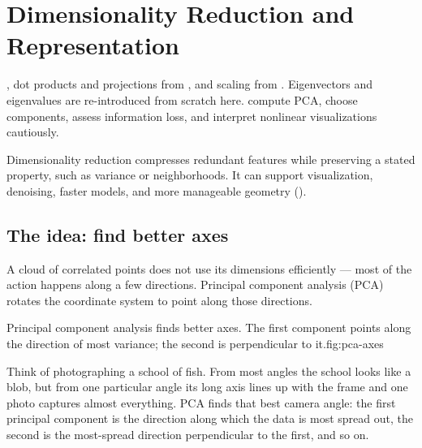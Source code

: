 \chapter{Dimensionality Reduction and Representation}
\label{ch:dimred}

\chapterguide%
  {, dot products and projections from , and scaling from . Eigenvectors and eigenvalues are re-introduced from scratch here.}
  {compute PCA, choose components, assess information loss, and interpret nonlinear visualizations cautiously.}

Dimensionality reduction compresses redundant features while preserving a stated property, such as variance or neighborhoods. It can support visualization, denoising, faster models, and more manageable geometry ().

\section{The idea: find better axes}

A cloud of correlated points does not use its dimensions efficiently --- most of the action happens along a few directions. Principal component analysis (PCA) rotates the coordinate system to point along those directions.

\begin{utpfig}{Principal component analysis finds better axes. The first component points along the direction of most variance; the second is perpendicular to it.}{fig:pca-axes}
\end{utpfig}

\begin{intuition}
Think of photographing a school of fish. From most angles the school looks like a blob, but from one particular angle its long axis lines up with the frame and one photo captures almost everything. PCA finds that best camera angle: the first principal component is the direction along which the data is most spread out, the second is the most-spread direction perpendicular to the first, and so on.
\end{intuition}

